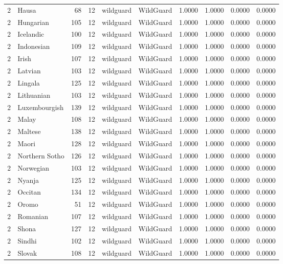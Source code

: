 \begin{tabular}{rlrrllrrrr}
2 & Hausa & 68 & 12 & wildguard & WildGuard & 1.0000 & 1.0000 & 0.0000 & 0.0000 \\
2 & Hungarian & 105 & 12 & wildguard & WildGuard & 1.0000 & 1.0000 & 0.0000 & 0.0000 \\
2 & Icelandic & 100 & 12 & wildguard & WildGuard & 1.0000 & 1.0000 & 0.0000 & 0.0000 \\
2 & Indonesian & 109 & 12 & wildguard & WildGuard & 1.0000 & 1.0000 & 0.0000 & 0.0000 \\
2 & Irish & 107 & 12 & wildguard & WildGuard & 1.0000 & 1.0000 & 0.0000 & 0.0000 \\
2 & Latvian & 103 & 12 & wildguard & WildGuard & 1.0000 & 1.0000 & 0.0000 & 0.0000 \\
2 & Lingala & 125 & 12 & wildguard & WildGuard & 1.0000 & 1.0000 & 0.0000 & 0.0000 \\
2 & Lithuanian & 103 & 12 & wildguard & WildGuard & 1.0000 & 1.0000 & 0.0000 & 0.0000 \\
2 & Luxembourgish & 139 & 12 & wildguard & WildGuard & 1.0000 & 1.0000 & 0.0000 & 0.0000 \\
2 & Malay & 108 & 12 & wildguard & WildGuard & 1.0000 & 1.0000 & 0.0000 & 0.0000 \\
2 & Maltese & 138 & 12 & wildguard & WildGuard & 1.0000 & 1.0000 & 0.0000 & 0.0000 \\
2 & Maori & 128 & 12 & wildguard & WildGuard & 1.0000 & 1.0000 & 0.0000 & 0.0000 \\
2 & Northern Sotho & 126 & 12 & wildguard & WildGuard & 1.0000 & 1.0000 & 0.0000 & 0.0000 \\
2 & Norwegian & 103 & 12 & wildguard & WildGuard & 1.0000 & 1.0000 & 0.0000 & 0.0000 \\
2 & Nyanja & 125 & 12 & wildguard & WildGuard & 1.0000 & 1.0000 & 0.0000 & 0.0000 \\
2 & Occitan & 134 & 12 & wildguard & WildGuard & 1.0000 & 1.0000 & 0.0000 & 0.0000 \\
2 & Oromo & 51 & 12 & wildguard & WildGuard & 1.0000 & 1.0000 & 0.0000 & 0.0000 \\
2 & Romanian & 107 & 12 & wildguard & WildGuard & 1.0000 & 1.0000 & 0.0000 & 0.0000 \\
2 & Shona & 127 & 12 & wildguard & WildGuard & 1.0000 & 1.0000 & 0.0000 & 0.0000 \\
2 & Sindhi & 102 & 12 & wildguard & WildGuard & 1.0000 & 1.0000 & 0.0000 & 0.0000 \\
2 & Slovak & 108 & 12 & wildguard & WildGuard & 1.0000 & 1.0000 & 0.0000 & 0.0000 \\

\end{tabular}
